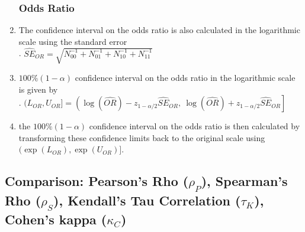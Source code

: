\begin{enumerate}
\subsubsection{Odds Ratio}

    \item The confidence interval on the odds ratio is also calculated in the logarithmic scale using the standard error
    \hfill \cite{statistics/book/Statistics-for-Data-Scientists/Maurits-Kaptein}
    \\
    .\hfill
    $ \hat{S E}_{O R} = \sqrt{N^{-1}_{00} + N^{-1}_{01} + N^{-1}_{10} + N^{-1}_{11} } $
    \hfill \cite{statistics/book/Statistics-for-Data-Scientists/Maurits-Kaptein}

    \item $100\%(1 - \alpha)$ confidence interval on the odds ratio in the logarithmic scale is given by
    \hfill \cite{statistics/book/Statistics-for-Data-Scientists/Maurits-Kaptein}
    \\
    .\hfill
    $
        (L_{O R} , U_{O R} ] =
        \left(
            \log( \hat{OR}) - z_{1-\alpha/2} \hat{SE}_{OR} , 
            \ \log( \hat{OR}) + z_{1-\alpha/2} \hat{SE}_{OR}
        \right]
    $
    \hfill \cite{statistics/book/Statistics-for-Data-Scientists/Maurits-Kaptein}

    \item  the $100\%(1 - \alpha)$ confidence interval on the odds ratio is then calculated by transforming these confidence limits back to the original scale using $(\exp(L_{O R} ), \exp (U_{O R} )]$.
    \hfill \cite{statistics/book/Statistics-for-Data-Scientists/Maurits-Kaptein}
\end{enumerate}

















\subsection{Comparison: Pearson’s Rho ($\rho_P$), Spearman’s Rho ($\rho_S$), Kendall’s Tau Correlation ($\tau_K$), Cohen’s kappa ($\kappa_C$)}

